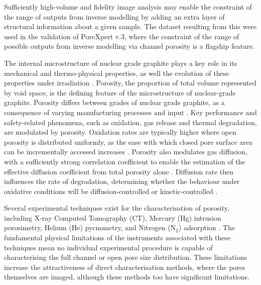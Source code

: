 \documentclass[review]{elsarticle}
\begin{document}
Sufficiently high-volume and fidelity image analysis may enable the constraint
of the range of outputs from inverse modelling by adding an extra layer of
structural information about a given sample. The dataset resulting from this
were used in the validation of PoreXpert\texttrademark{} v.3, where the
constraint of the range of possible outputs from inverse modelling via channel
porosity is a flagship feature. 

The internal microstructure of nuclear grade graphite plays a key role in its
mechanical and thermo-physical properties, as well the evolution of these
properties under irradiation \citep{MARSDENgeniv}. Porosity, the proportion of
total volume represented by void space,  is the defining feature of the
microstructure of nuclear-grade graphite.  Porosity differs between grades of
nuclear grade graphite, as a consequence of varying manufacturing processes and
input \citep{ARREGUIMENA2022112047}. Key performance and safety-related
phenomena, such as oxidation, gas release and thermal degradation, are modulated
by porosity. Oxidation rates are typically higher where open porosity is
distributed uniformly, as the ease with which closed pore surface area can be
incrementally accessed increases \citep{PAUL2022132}. Porosity also modulates
gas diffusion, with a sufficiently strong correlation coefficient to enable the
estimation of the effective diffusion coefficient from total porosity alone
\citep{KANE2018369}. Diffusion rate then influences the rate of degradation,
determining whether the behaviour under oxidative conditions will be
diffusion-controlled or kinetic-controlled \citep{MATTHEWS2021111245}. 

Several experimental techniques exist for the characterisation of porosity,
including X-ray Computed Tomography (CT), Mercury (Hg) intrusion
porosimetry, Helium (He) pycnometry, and Nitrogen (N$_2$) adsorption
\citep{ARREGUIMENA2022112047, JONES2020256HgHe, CONTESCU2019663}. The
fundamental physical limitations of the instruments associated with these
techniques mean no individual experimental procedure is capable of
characterising the full channel or open pore size distribution. These
limitations increase the attractiveness of direct characterisation methods,
where the pores themselves are imaged, although these methods too have
significant limitations.

\end{document}
